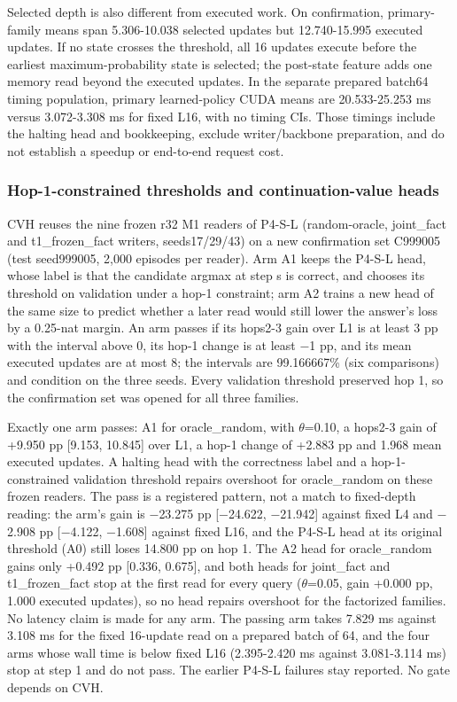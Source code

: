 Selected depth is also different from executed work. On confirmation, primary-family
means span 5.306-10.038 selected updates but 12.740-15.995 executed updates.
 If no state crosses the threshold, all 16 updates execute before the  %
earliest maximum-probability state is selected; the post-state feature adds one
memory read beyond the executed updates. In the separate prepared  %
batch64 timing population, primary learned-policy CUDA means are 20.533-25.253 ms
versus 3.072-3.308 ms for fixed L16, with no timing CIs. Those timings  %
include the halting head and bookkeeping, exclude writer/\allowbreak{}backbone preparation,
and do not establish a speedup or end-to-end request cost.  %

\subsubsection*{Hop-1-constrained thresholds and continuation-value heads}

CVH reuses the nine frozen r32 M1 readers of P4-S-L (random-oracle, joint\_fact and
t1\_frozen\_fact writers, seeds17/\allowbreak{}29/\allowbreak{}43) on a new confirmation set C999005 (test seed999005,
2,000 episodes per reader). Arm A1 keeps the P4-S-L head, whose label is that the candidate
argmax at step s is correct, and chooses its threshold on validation under a hop-1 constraint;
arm A2 trains a new head of the same size to predict whether a later read would still lower
the answer’s loss by a 0.25-nat margin. An arm passes if its hops2-3 gain over L1 is at least
3 pp with the interval above 0, its hop-1 change is at least \ensuremath{-}1 pp, and its mean executed
updates are at most 8; the intervals are 99.166667\% (six comparisons) and condition on the
three seeds. Every validation threshold preserved hop 1, so the confirmation set  %
was opened for all three families.  %

Exactly one arm passes: A1 for oracle\_random, with \ensuremath{\theta}=0.10, a hops2-3 gain of +9.950 pp
[9.153, 10.845] over L1, a hop-1 change of +2.883 pp and 1.968 mean executed updates. A halting
head with the correctness label and a hop-1-constrained validation threshold repairs overshoot
for oracle\_random on these frozen readers. The pass is a registered pattern, not  %
a match to fixed-depth reading: the arm’s gain is \ensuremath{-}23.275 pp [\ensuremath{-}24.622, \ensuremath{-}21.942] against fixed L4
and \ensuremath{-}2.908 pp [\ensuremath{-}4.122, \ensuremath{-}1.608] against fixed L16, and the P4-S-L head at its original threshold
(A0) still loses 14.800 pp on hop 1. The A2 head for oracle\_random gains  %
only +0.492 pp [0.336, 0.675], and both heads for joint\_fact and t1\_frozen\_fact stop at the first
read for every query (\ensuremath{\theta}=0.05, gain +0.000 pp, 1.000 executed updates), so no head repairs
overshoot for the factorized families. No latency claim is made for any arm. The  %
passing arm takes 7.829 ms against 3.108 ms for the fixed 16-update read on a prepared batch of
64, and the four arms whose wall time is below fixed L16 (2.395-2.420 ms against 3.081-3.114 ms)
stop at step 1 and do not pass. The earlier P4-S-L failures stay reported.  %
No gate depends on CVH.  %

